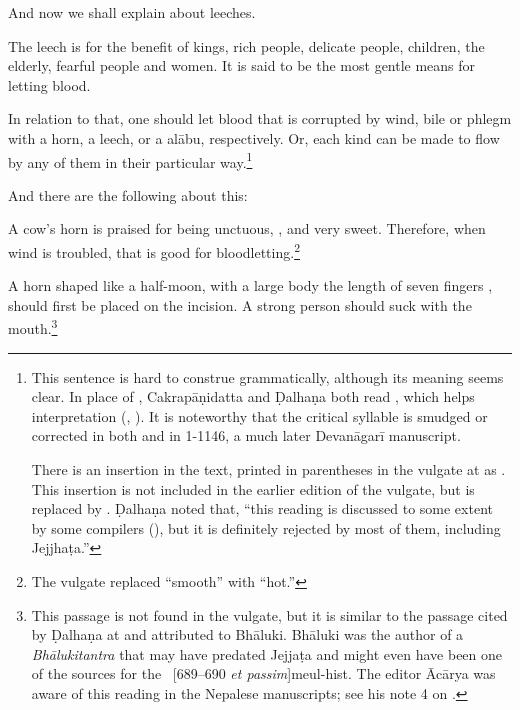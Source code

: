 \begin{translation}    
\item [1] 
    And now we shall explain  about leeches.
    
\item [2]The leech is for the benefit of kings, rich people, 
delicate people,
children, the elderly, fearful people and women.  It is said to be the most
gentle means for letting blood. 

\item [3]

In relation to that, one should let blood that is corrupted by wind, bile or
phlegm with a horn, a leech, or a \gls{alābu}, respectively.   Or, each kind
can be made to flow by any of them in their particular way.\footnote{This
    sentence is hard to construe grammatically, although its meaning seems
    clear. In place of , Cakrapāṇidatta and Ḍalhaṇa both read
    , which helps interpretation (\cite[95]{acar-1939},
    \cite[55]{vulgate}). It is noteworthy that the critical syllable  is
    smudged or corrected in both  and in 1-1146, a
    much later Devanāgarī manuscript.
      
There is an insertion in the text, printed in parentheses in the
vulgate at  as  .  This insertion is not included in the
earlier edition of the vulgate, but is replaced by
 \citep[54]{susr-trikamji2}. Ḍalhaṇa noted that,
“this reading is discussed to some extent by some compilers
(), but it is definitely rejected by most of them,
including Jejjhaṭa.” }



\item [4]
And there are the following about this:

\begin{sloka}
    A cow's horn is praised for being unctuous, , and very
sweet.  Therefore, when wind is troubled, that is good for
bloodletting.\footnote{The vulgate replaced “smooth” with “hot.”}
\end{sloka}

\item [5]

\begin{sloka}
    A horn shaped like a half-moon,
    with a large body the length of seven fingers , should first be placed on the 
    incision.  A strong person should 
    suck with
the mouth.\footnote{This passage is not found in the vulgate, but it is
    similar to the passage cited by Ḍalhaṇa at  and attributed to
    Bhāluki.  Bhāluki was the author of a \emph{Bhālukitantra} that may have
    predated Jejjaṭa and might even have been one of the sources for the \SS\
    [689--690 \emph{et passim}]{meul-hist}. The editor Ācārya was
    aware of this reading in the Nepalese manuscripts; see his note 4 on
    \Su{1.13.5}{55, note 4}.}
\end{sloka}


\end{translation}
